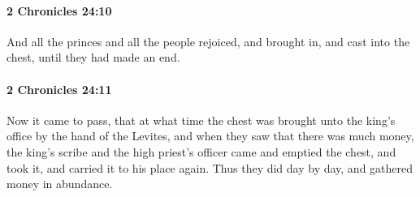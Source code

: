 		\paragraph{2 Chronicles 24:10} %
			\label{2CHRONICLES-24-10}

			And all the princes and all the people rejoiced, and brought in, and cast into the chest, until they had made an end.


		\paragraph{2 Chronicles 24:11} %
			\label{2CHRONICLES-24-11}

			Now it came to pass, that at what time the chest was brought unto the king's office by the hand of the Levites, and when they saw that there was much money, the king's scribe and the high priest's officer came and emptied the chest, and took it, and carried it to his place again. Thus they did day by day, and gathered money in abundance.


